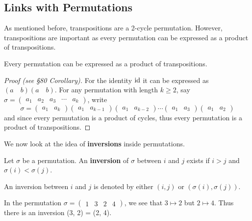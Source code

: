 \subsection{Links with Permutations}
As mentioned before, transpositions are a 2-cycle permutation. However, transpositions are important as every permutation can be expressed as a product of transpositions.
\begin{lemma}\label{lemma-permutations-as-product-of-transpositions}
    Every permutation can be expressed as a product of transpositions.
\end{lemma}
\begin{proof}[Proof (see \cite{clark_1984} \S 80 Corollary)]
    For the identity $\mathrm{id}$ it can be expressed as $(a\quad b)(a \quad b)$. For any permutation with length $k \geq 2$, say $\sigma = \begin{pmatrix}a_1 & a_2 & a_3 & \cdots & a_k\end{pmatrix}$, write
    \[
        \sigma = \begin{pmatrix}a_1 & a_k\end{pmatrix}    \begin{pmatrix}a_1 & a_{k-1}\end{pmatrix}\begin{pmatrix}a_1 & a_{k-2}\end{pmatrix}\cdots\begin{pmatrix}a_1 & a_3\end{pmatrix}\begin{pmatrix}a_1 & a_2\end{pmatrix}
    \]
    and since every permutation is a product of cycles, thus every permutation is a product of transpositions.
\end{proof}

We now look at the idea of \textbf{inversions} inside permutations.
\begin{definition}
    Let $\sigma$ be a permutation. An \textbf{inversion} of $\sigma$ between $i$ and $j$ exists if $i > j$ and $\sigma(i) < \sigma(j)$.
\end{definition}
An inversion between $i$ and $j$ is denoted by either $(i, j)$ or $(\sigma(i), \sigma(j))$.
\begin{example}
    In the permutation $\sigma = \begin{pmatrix}1 & 3 & 2 & 4\end{pmatrix}$, we see that $3 \mapsto 2$ but $2 \mapsto 4$. Thus there is an inversion (3, 2) = (2, 4).
\end{example}

